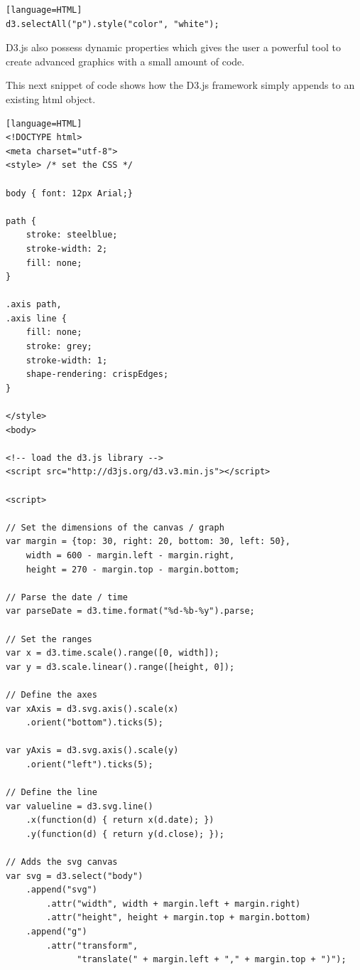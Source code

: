 \begin{lstlisting}[caption={D3.js example}, label={lst:d3js}][language=HTML]
d3.selectAll("p").style("color", "white");
\end{lstlisting}

D3.js also possess dynamic properties which gives the user a powerful tool to create advanced graphics with a small amount of code. 

This next snippet of code shows how the D3.js framework simply appends to an existing html object. \cite{simple_graph}
\begin{lstlisting}[caption={Example of use of the D3.js framework}, label={lst:d3example}][language=HTML]
<!DOCTYPE html>
<meta charset="utf-8">
<style> /* set the CSS */

body { font: 12px Arial;}

path { 
    stroke: steelblue;
    stroke-width: 2;
    fill: none;
}

.axis path,
.axis line {
    fill: none;
    stroke: grey;
    stroke-width: 1;
    shape-rendering: crispEdges;
}

</style>
<body>

<!-- load the d3.js library -->    
<script src="http://d3js.org/d3.v3.min.js"></script>

<script>

// Set the dimensions of the canvas / graph
var margin = {top: 30, right: 20, bottom: 30, left: 50},
    width = 600 - margin.left - margin.right,
    height = 270 - margin.top - margin.bottom;

// Parse the date / time
var parseDate = d3.time.format("%d-%b-%y").parse;

// Set the ranges
var x = d3.time.scale().range([0, width]);
var y = d3.scale.linear().range([height, 0]);

// Define the axes
var xAxis = d3.svg.axis().scale(x)
    .orient("bottom").ticks(5);

var yAxis = d3.svg.axis().scale(y)
    .orient("left").ticks(5);

// Define the line
var valueline = d3.svg.line()
    .x(function(d) { return x(d.date); })
    .y(function(d) { return y(d.close); });
    
// Adds the svg canvas
var svg = d3.select("body")
    .append("svg")
        .attr("width", width + margin.left + margin.right)
        .attr("height", height + margin.top + margin.bottom)
    .append("g")
        .attr("transform", 
              "translate(" + margin.left + "," + margin.top + ")");


\end{lstlisting}
